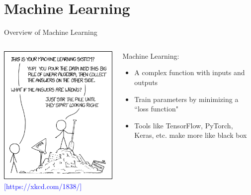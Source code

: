 \documentclass{beamer}
\newcommand\reference[1]{%
{\tiny \textcolor{blue}{[#1]}}
}
\begin{document}
\section{Machine Learning}

\begin{frame}{Overview of Machine Learning}
\begin{columns}
    \begin{column}{5cm}
    \begin{center}
    \includegraphics[width=\textwidth]{figs/machine_learning.png} \\
    \reference{https://xkcd.com/1838/}
    \end{center}
    \end{column}
    \begin{column}{5cm}
    Machine Learning:
    \begin{itemize}
        \item A complex function with inputs and outputs
        \item Train parameters by minimizing a ``loss function"
        \item Tools like TensorFlow, PyTorch, Keras, etc. make more like black box
    \end{itemize}
    \end{column}
\end{columns}
\end{frame}
\end{document}
